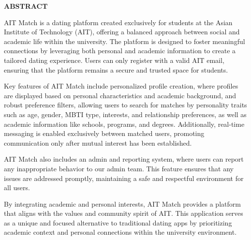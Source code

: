 
{}

\begin{center}
    \large{\bf ABSTRACT}
\end{center}

AIT Match is a dating platform created exclusively for students at the Asian Institute of Technology (AIT), offering a balanced approach between social and academic life within the university. The platform is designed to foster meaningful connections by leveraging both personal and academic information to create a tailored dating experience. Users can only register with a valid AIT email, ensuring that the platform remains a secure and trusted space for students.

Key features of AIT Match include personalized profile creation, where profiles are displayed based on personal characteristics and academic background, and robust preference filters, allowing users to search for matches by personality traits such as age, gender, MBTI type, interests, and relationship preferences, as well as academic information like schools, programs, and degrees. Additionally, real-time messaging is enabled exclusively between matched users, promoting communication only after mutual interest has been established.

AIT Match also includes an admin and reporting system, where users can report any inappropriate behavior to our admin team. This feature ensures that any issues are addressed promptly, maintaining a safe and respectful environment for all users.

By integrating academic and personal interests, AIT Match provides a platform that aligns with the values and community spirit of AIT. This application serves as a unique and focused alternative to traditional dating apps by prioritizing academic context and personal connections within the university environment.
